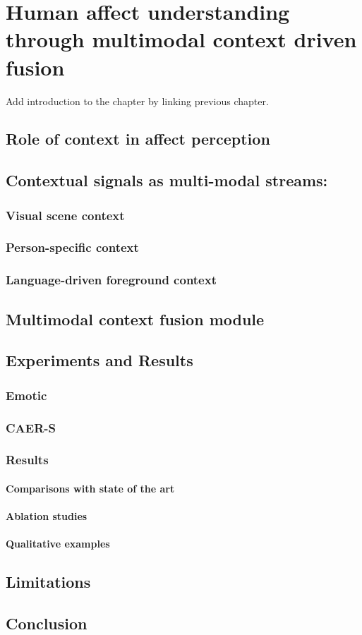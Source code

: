 \chapter{Human affect understanding through multimodal context driven fusion}

Add introduction to the chapter by linking previous chapter.
\section{Role of context in affect perception}
\section{Contextual signals as multi-modal streams:}
\subsection{Visual scene context}
\subsection{Person-specific context}
\subsection{Language-driven foreground context}
\section{Multimodal context fusion module}
\section{Experiments and Results}
\subsection{Emotic}
\subsection{CAER-S}
\subsection{Results}
\subsubsection{Comparisons with state of the art}
\subsubsection{Ablation studies}
\subsubsection{Qualitative examples}
\section{Limitations}
\section{Conclusion}


